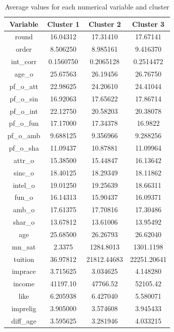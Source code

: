 \begin{table}[h!]
\centering
\begin{tabular}{|c| c| c| c|}
 \hline
 
 \textbf{Variable} & \textbf{Cluster 1} & \textbf{Cluster 2} & \textbf{Cluster 3}\\ [0.5ex]
 \hline\hline
 round & 16.04312 & 17.31410 & 17.67141\\
 order & 8.506250 & 8.985161 & 9.416370\\
 int\_corr & 0.1560750 & 0.2065128 & 0.2514472\\
 age\_o & 25.67563 & 26.19456 & 26.76750 \\
 pf\_o\_att & 22.98625  & 24.20610 & 24.41044\\
 pf\_o\_sin & 16.92063 & 17.65622 & 17.86714\\
 pf\_o\_int & 22.12750 & 20.58203 & 20.38078\\
 pf\_o\_fun & 17.17000 & 17.34378 & 16.9822\\
 pf\_o\_amb & 9.688125 & 9.356966 & 9.288256\\
 pf\_o\_sha & 11.09437 & 10.87881 & 11.09964\\
 attr\_o & 15.38500 & 15.44847 & 16.13642\\
 sinc\_o & 18.40125 & 18.29349 & 18.11862\\
 intel\_o & 19.01250 & 19.25639 & 18.66311\\
 fun\_o & 16.14313 & 15.90437 & 16.09371\\
 amb\_o & 17.61375 & 17.70816 & 17.30486\\
 shar\_o & 13.67812 & 13.61006 & 13.95492\\
 age & 25.68500 & 26.26793 & 26.62040\\
 mn\_sat & 2.3375 & 1284.8013 & 1301.1198\\
 tuition & 36.97812 & 21812.44683 & 22251.20641\\
 imprace & 3.715625 & 3.034625 & 4.148280\\
 income & 41197.10 & 47766.52 & 52105.42\\
 like & 6.205938 & 6.427040 & 5.580071\\
 imprelig & 3.905000 & 3.574608 & 3.945433\\
 diff\_age & 3.595625 & 3.281946 & 4.033215\\
 \hline
\end{tabular}
\caption{Average values for each numerical variable and cluster}
\label{table:1}
\end{table}


